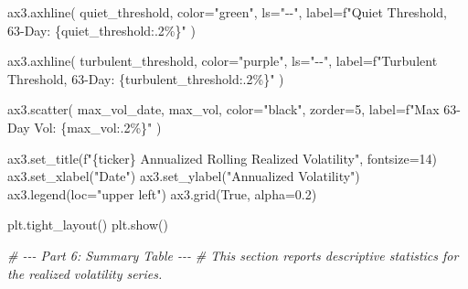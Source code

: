\documentclass[
  11pt,
]{article}
\newenvironment{Shaded}{}{}
\newcommand{\CommentTok}[1]{\textcolor[rgb]{0.38,0.63,0.69}{\textit{#1}}}
\newcommand{\DecValTok}[1]{\textcolor[rgb]{0.25,0.63,0.44}{#1}}
\newcommand{\FloatTok}[1]{\textcolor[rgb]{0.25,0.63,0.44}{#1}}
\newcommand{\NormalTok}[1]{#1}
\newcommand{\OperatorTok}[1]{\textcolor[rgb]{0.40,0.40,0.40}{#1}}
\newcommand{\SpecialCharTok}[1]{\textcolor[rgb]{0.25,0.44,0.63}{#1}}
\newcommand{\SpecialStringTok}[1]{\textcolor[rgb]{0.73,0.40,0.53}{#1}}
\newcommand{\StringTok}[1]{\textcolor[rgb]{0.25,0.44,0.63}{#1}}
\newcommand{\VariableTok}[1]{\textcolor[rgb]{0.10,0.09,0.49}{#1}}
\begin{document}
\begin{Shaded}
\begin{Highlighting}[]
\NormalTok{ax3.axhline(}
\NormalTok{    quiet\_threshold,}
\NormalTok{    color}\OperatorTok{=}\StringTok{"green"}\NormalTok{,}
\NormalTok{    ls}\OperatorTok{=}\StringTok{"{-}{-}"}\NormalTok{,}
\NormalTok{    label}\OperatorTok{=}\SpecialStringTok{f"Quiet Threshold, 63{-}Day: }\SpecialCharTok{\{}\NormalTok{quiet\_threshold}\SpecialCharTok{:.2\%\}}\SpecialStringTok{"}
\NormalTok{)}

\NormalTok{ax3.axhline(}
\NormalTok{    turbulent\_threshold,}
\NormalTok{    color}\OperatorTok{=}\StringTok{"purple"}\NormalTok{,}
\NormalTok{    ls}\OperatorTok{=}\StringTok{"{-}{-}"}\NormalTok{,}
\NormalTok{    label}\OperatorTok{=}\SpecialStringTok{f"Turbulent Threshold, 63{-}Day: }\SpecialCharTok{\{}\NormalTok{turbulent\_threshold}\SpecialCharTok{:.2\%\}}\SpecialStringTok{"}
\NormalTok{)}

\NormalTok{ax3.scatter(}
\NormalTok{    max\_vol\_date,}
\NormalTok{    max\_vol,}
\NormalTok{    color}\OperatorTok{=}\StringTok{"black"}\NormalTok{,}
\NormalTok{    zorder}\OperatorTok{=}\DecValTok{5}\NormalTok{,}
\NormalTok{    label}\OperatorTok{=}\SpecialStringTok{f"Max 63{-}Day Vol: }\SpecialCharTok{\{}\NormalTok{max\_vol}\SpecialCharTok{:.2\%\}}\SpecialStringTok{"}
\NormalTok{)}

\NormalTok{ax3.set\_title(}\SpecialStringTok{f"}\SpecialCharTok{\{}\NormalTok{ticker}\SpecialCharTok{\}}\SpecialStringTok{ Annualized Rolling Realized Volatility"}\NormalTok{, fontsize}\OperatorTok{=}\DecValTok{14}\NormalTok{)}
\NormalTok{ax3.set\_xlabel(}\StringTok{"Date"}\NormalTok{)}
\NormalTok{ax3.set\_ylabel(}\StringTok{"Annualized Volatility"}\NormalTok{)}
\NormalTok{ax3.legend(loc}\OperatorTok{=}\StringTok{"upper left"}\NormalTok{)}
\NormalTok{ax3.grid(}\VariableTok{True}\NormalTok{, alpha}\OperatorTok{=}\FloatTok{0.2}\NormalTok{)}

\NormalTok{plt.tight\_layout()}
\NormalTok{plt.show()}


\CommentTok{\# {-}{-}{-} Part 6: Summary Table {-}{-}{-}}
\CommentTok{\# This section reports descriptive statistics for the realized volatility series.}


\end{Highlighting}
\end{Shaded}
\end{document}
